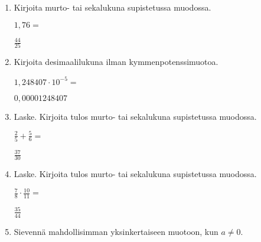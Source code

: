 \documentclass[finnish, a4paper, 12pt]{article}
\begin{document}
	\begin{enumerate}[leftmargin=*]
		\setlength\itemsep{1em}
		
		\item %
		Kirjoita murto- tai sekalukuna supistetussa muodossa. 
		
		\(
		1{,}76 = 
		\) %
		
		\begin{version:withAnswers}
		\( \frac{44}{25} \)
		\end{version:withAnswers}

		\vspace{8pt}
		
		\item %
		Kirjoita desimaalilukuna ilman kymmenpotenssimuotoa. 
		
		\(
		1{,}248407\cdot 10^{-5} = 
		\) %
		\begin{version:withAnswers}
		\( 0,00001248407 \)
		\end{version:withAnswers}	
		\vspace{8pt}
		
		\item %
		Laske. Kirjoita tulos murto- tai sekalukuna supistetussa muodossa.
		
		\(
		\displaystyle
		\frac{2}{5}+\frac{5}{6} = 
		\) %
		\begin{version:withAnswers}
		\( \frac{37}{30} \)
		\end{version:withAnswers}	
		
		\vspace{8pt}
		
		\item %
		Laske. Kirjoita tulos murto- tai sekalukuna supistetussa muodossa.
		
		\(
		\displaystyle
		\frac{7}{8}\cdot\frac{10}{11} = 
		\) %
		\begin{version:withAnswers}
		\( \frac{35}{44} \)
		\end{version:withAnswers}
		
		\vspace{8pt}
		
		\item %
		Sievennä mahdollisimman yksinkertaiseen muotoon, kun \(a \not = 0\). 
		

\end{enumerate}
\end{document}
